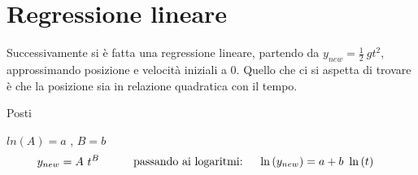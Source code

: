 \documentclass[12pt, a4paper]{article}
\begin{document}
  



\section{Regressione lineare}
Successivamente si è fatta una regressione lineare, partendo da $y_{new}= \frac{1}{2}\ g t^2$, approssimando posizione e velocità iniziali a $0$. Quello che ci si aspetta di trovare è che la posizione sia in relazione quadratica con il tempo.

Posti

\phantom{aad} $ln{(A)}=a$ \phantom{aad} , \phantom{aad} $B=b$
\begin{equation*}
\begin{aligned}
  & y_{new}= A\ t^B
  &\quad{} 
  \end{aligned}
  \begin{aligned}
  &&\text{passando ai logaritmi:\phantom{..}}& & \ln{(y_{new})}=a +b\ \ln{(t)}
  &
  \end{aligned}
\end{equation*}
\end{document}
